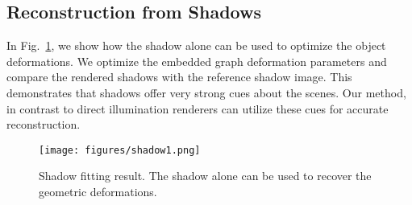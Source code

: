 \subsection{Reconstruction from Shadows}
%
In Fig.~\ref{fig:shadow}, we show how the shadow alone can be used to optimize the object deformations. 
%
We optimize the embedded graph deformation parameters and compare the rendered shadows with the reference shadow image.
%
This demonstrates that shadows offer very strong cues about the scenes. 
%
Our method, in contrast to direct illumination renderers can utilize these cues for accurate reconstruction.
%
%
\begin{figure}
	\texttt{[image: figures/shadow1.png]} 
	\caption
	{
		Shadow fitting result.
		The shadow alone can be used to recover the geometric deformations.
	}
	\label{fig:shadow}
\end{figure}
%
%
%
